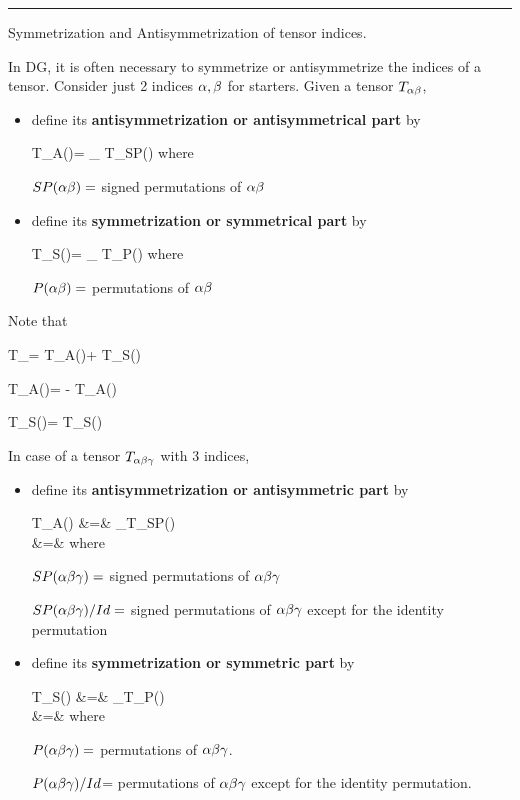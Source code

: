 \hrule
 Symmetrization
and Antisymmetrization 
of tensor indices.

In DG, it
is often
necessary to symmetrize
or antisymmetrize the
indices of a tensor. Consider just 2 indices 
$\alpha, \beta$ for starters.
Given a tensor $T_{\alpha\beta}$,
\begin{itemize}
\item define
its {\bf antisymmetrization 
or antisymmetrical part} by

\beq
T_{A(\alp\beta)}=
_
{T_{SP(\alp \beta)}}
\eeq
where

$SP(\alpha\beta)=$ signed permutations of $\alpha\beta$

\item define its {\bf symmetrization
or symmetrical part} by

\beq
T_{S(\alp\beta)}=
_
{T_{P(\alp \beta)}}
\eeq
where

$P(\alpha\beta)=$ permutations of $\alpha\beta$
\end{itemize}

Note that

\beq
T_{\alp \beta}=
T_{A(\alp\beta)}+ T_{S(\alp\beta)}
\eeq

\beq
T_{A(\alp\beta)}= - T_{A(\beta\alp)}
\eeq

\beq
T_{S(\alp\beta)}=  T_{S(\beta\alp)}
\eeq

In case of a tensor $T_{\alpha\beta\gamma}$
with 3 indices, 

\begin{itemize}
\item
define
its {\bf antisymmetrization 
or antisymmetric part} by

\beqa
T_{A(\alpha \beta \gamma)}
&=&
_{T_{SP(\alpha \beta \gamma)}}
\\
&=&
\eeqa
where 

$SP(\alpha\beta\gamma)=$ signed permutations
of $\alpha\beta\gamma$

$SP(\alpha\beta\gamma)/Id=$
signed permutations 
of $\alpha\beta \gamma$ except for the identity
permutation

\item define its 
{\bf symmetrization or symmetric  part} by 

\beqa
T_{S(\alpha \beta \gamma)}
&=&
_{T_{P(\alpha \beta \gamma)}}
\\
&=&
\eeqa
where

$P(\alpha\beta\gamma)=$
permutations of $\alpha\beta\gamma$.

$P(\alpha\beta\gamma)/Id$=
permutations
of  $\alpha\beta\gamma$ 
except for the identity
permutation.

\end{itemize}

